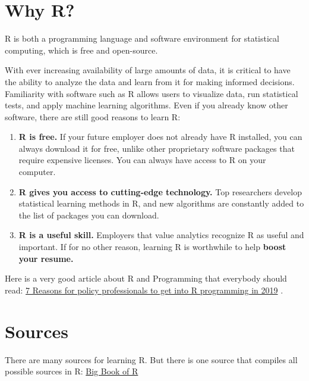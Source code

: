 \documentclass[
]{book}
\begin{document}
\hypertarget{why-r}{%
\section*{Why R?}\label{why-r}}

R is both a programming language and software environment for statistical computing, which is free and open-source.

With ever increasing availability of large amounts of data, it is critical to have the ability to analyze the data and learn from it for making informed decisions. Familiarity with software such as R allows users to visualize data, run statistical tests, and apply machine learning algorithms. Even if you already know other software, there are still good reasons to learn R:

\begin{enumerate}
\def\labelenumi{\arabic{enumi}.}
\item
  \textbf{R is free.} If your future employer does not already have R installed, you can always download it for free, unlike other proprietary software packages that require expensive licenses. You can always have access to R on your computer.
\item
  \textbf{R gives you access to cutting-edge technology.} Top researchers develop statistical learning methods in R, and new algorithms are constantly added to the list of packages you can download.
\item
  \textbf{R is a useful skill.} Employers that value analytics recognize R as useful and important. If for no other reason, learning R is worthwhile to help \textbf{boost your resume.}
\end{enumerate}

Here is a very good article about R and Programming that everybody should read: \href{http://gilesd-j.com/2019/01/07/7-reasons-for-policy-professionals-to-get-pumped-about-r-programming-in-2019/}{7 Reasons for policy professionals to get into R programming in 2019} \citep{Jones_2019}.

\hypertarget{sources}{%
\section*{Sources}\label{sources}}

There are many sources for learning R. But there is one source that compiles all possible sources in R: \href{https://www.bigbookofr.com/index.html}{Big Book of R}
\end{document}
